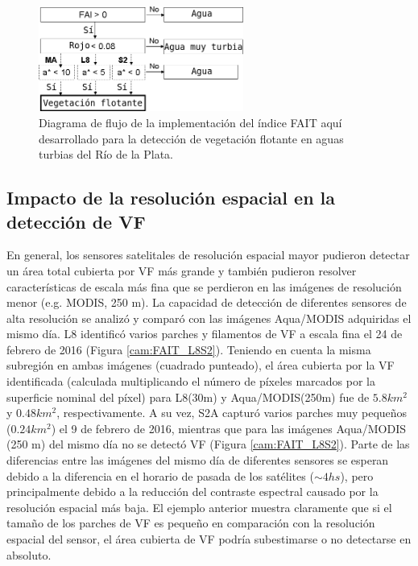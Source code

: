         \begin{figure}
        \centering
        \includegraphics[width=0.6\textwidth]{cam/figures/esquema.png}
        \caption{Diagrama de flujo de la implementación del índice FAIT aquí desarrollado para la detección de vegetación flotante en aguas turbias del Río de la Plata.}
        \label{cam:esquema}
        \end{figure}
    
    \subsection{Impacto de la resolución espacial en la detección de VF}
    \label{cam:s:impacto}
    
        En general, los sensores satelitales de resolución espacial mayor pudieron detectar un área total cubierta por VF más grande y también pudieron resolver características de escala más fina que se perdieron en las imágenes de resolución menor (e.g.  MODIS, 250 m). La capacidad de detección de diferentes sensores de alta resolución se analizó y comparó con las imágenes Aqua/MODIS adquiridas el mismo día. L8 identificó varios parches y filamentos de VF a escala fina el 24 de febrero de 2016 (Figura \ref{cam:FAIT_L8S2}). Teniendo en cuenta la misma subregión en ambas imágenes (cuadrado punteado), el área cubierta por la VF identificada (calculada multiplicando el número de píxeles marcados por la superficie nominal del píxel) para L8(30m) y Aqua/MODIS(250m) fue de $5.8 km^{2}$ y $0.48 km^{2}$, respectivamente. A su vez, S2A capturó varios parches muy pequeños ($0.24 km^{2}$) el 9 de febrero de 2016, mientras que para las imágenes Aqua/MODIS (250 m) del mismo día no se detectó VF (Figura \ref{cam:FAIT_L8S2}). Parte de las diferencias entre las imágenes del mismo día de diferentes sensores se esperan debido a la diferencia en el horario de pasada de los satélites ($\sim 4 hs$), pero principalmente debido a la reducción del contraste espectral causado por la resolución espacial más baja. El ejemplo anterior muestra claramente que si el tamaño de los parches de VF es pequeño en comparación con la resolución espacial del sensor, el área cubierta de VF podría subestimarse o no detectarse en absoluto.


